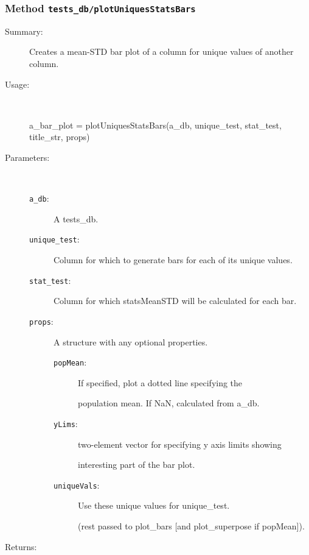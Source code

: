 \subsubsection[Method \texttt{plotUniquesStatsBars}]{Method \texttt{tests\_db/plotUniquesStatsBars}}%
%
\label{ref_tests_db__plotUniquesStatsBars}%
\hypertarget{ref_tests_db__plotUniquesStatsBars}{}%
\begin{description}
\item[Summary:]Creates a mean-STD bar plot of a column for unique values of another column.
%
\item[Usage:]~%
\begin{lyxcode}%
a\_bar\_plot = plotUniquesStatsBars(a\_db, unique\_test, stat\_test, title\_str, props)
%
\end{lyxcode}%
%
%
\item[Parameters:]~
\begin{description}%
\item[\texttt{a\_db}:]
 A tests\_db.
\item[\texttt{unique\_test}:]
 Column for which to generate bars for each of its unique values.
\item[\texttt{stat\_test}:]
 Column for which statsMeanSTD will be calculated for each bar.
\item[\texttt{props}:]
 A structure with any optional properties.
\begin{description}%
\item[\texttt{popMean}:]
 If specified, plot a dotted line specifying the

population mean. If NaN, calculated from a\_db.
\item[\texttt{yLims}:]
 two-element vector for specifying y axis limits showing

interesting part of the bar plot.
\item[\texttt{uniqueVals}:]
 Use these unique values for unique\_test.

(rest passed to plot\_bars [and plot\_superpose if popMean]).
\end{description}%
\end{description}%
%
\item[Returns:
]~


\end{description}
